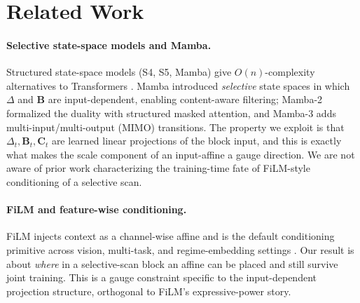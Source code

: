 \documentclass{article}
\begin{document}
\section{Related Work}\label{sec:related}

\paragraph{Selective state-space models and Mamba.}
Structured state-space models (S4, S5, Mamba) give $O(n)$-complexity alternatives
to Transformers \citep{gu2022efficiently, smith2023s5, gu2024mamba}. Mamba
introduced \emph{selective} state spaces in which $\Delta$ and $\mathbf{B}$ are
input-dependent, enabling content-aware filtering; Mamba-2 \citep{dao2024mamba2}
formalized the duality with structured masked attention, and Mamba-3
\citep{lahoti2026mamba3} adds multi-input/multi-output (MIMO) transitions. The
property we exploit is that $\Delta_t,\mathbf{B}_t,\mathbf{C}_t$ are learned linear
projections of the block input, and this is exactly what makes the scale component
of an input-affine a gauge direction. We are not aware of prior work characterizing the training-time
fate of FiLM-style conditioning of a selective scan.

\paragraph{FiLM and feature-wise conditioning.}
FiLM \citep{perez2018film} injects context as a channel-wise affine and is the
default conditioning primitive across vision, multi-task, and regime-embedding
settings \citep{lim2021time}. Our result is about \emph{where} in a selective-scan
block an affine can be placed and still survive joint training. This is a gauge
constraint specific to the input-dependent projection structure, orthogonal to
FiLM's expressive-power story.
\end{document}
